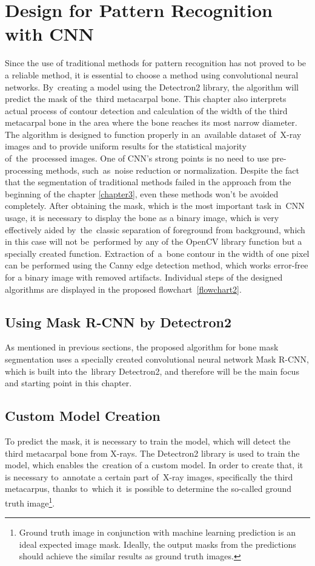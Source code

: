 \section{Design for Pattern Recognition with CNN}
\label{cnn-design}
Since the use of traditional methods for pattern recognition has not proved to be a reliable method, it is essential to choose a method using convolutional neural networks. By~creating a model using the Detectron2 library, the algorithm will predict the mask of the~third metacarpal bone. This chapter also interprets actual process of contour detection and calculation of the width of the third metacarpal bone in the area where the bone reaches its most narrow diameter. The algorithm is designed to function properly in an~available dataset of~X-ray images and to provide uniform results for the statistical majority of~the~processed images. One of CNN’s strong points is no need to use pre-processing methods, such~as~noise reduction or normalization. Despite the fact that the segmentation of traditional methods failed in the approach from the beginning of the chapter \ref{chapter3}, even these methods won't be avoided completely. After obtaining the mask, which is the most important task in~CNN usage, it is necessary to display the bone as a binary image, which is very effectively aided by~the~classic separation of foreground from background, which in this case will not be~performed by any of the OpenCV library function but a specially created function. Extraction of~a~bone contour in the width of one pixel can be performed using the Canny edge detection method, which works error-free for a binary image with removed artifacts. Individual steps of the designed algorithms are displayed in the proposed flowchart~\ref{flowchart2}.

\subsection{Using Mask R-CNN by Detectron2}
As mentioned in previous sections, the proposed algorithm for bone mask segmentation uses a specially created convolutional neural network Mask R-CNN, which is built into the~library Detectron2, and therefore will be the main focus and starting point in this chapter. 

\subsection{Custom Model Creation}
To predict the mask, it is necessary to train the model, which will detect the third metacarpal bone from X-rays. The Detectron2 library is used to train the model, which enables the~creation of a custom model. In order to create that, it is necessary to~annotate a certain part of~X-ray images, specifically the third metacarpus, thanks to~which it~is possible to determine the so-called ground truth image\footnote{Ground truth image in conjunction with machine learning prediction is an ideal expected image mask. Ideally, the output masks from the predictions should achieve the similar results as ground truth images.}.


